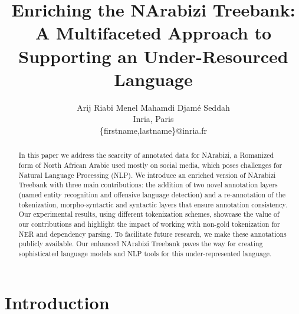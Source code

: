 \documentclass[11pt]{article}
\title{Enriching the NArabizi Treebank: A Multifaceted Approach to Supporting an Under-Resourced Language}
\author{Arij Riabi \quad Menel Mahamdi \quad Djamé Seddah \\
     Inria, Paris\\
     \{firstname,lastname\}@inria.fr}
\begin{document}






\maketitle
\begin{abstract}

  In this paper we address the scarcity of annotated data for
  NArabizi, a Romanized form of North African Arabic used mostly on
  social media, which poses challenges for Natural Language Processing
  (NLP). We introduce an enriched version of NArabizi Treebank
  \cite{seddah-etal-2020-building} with three main contributions: the
  addition of two novel annotation layers (named entity recognition
  and offensive language detection) and a re-annotation of the
  tokenization, morpho-syntactic and syntactic layers that ensure
  annotation consistency. Our experimental results, using different
  tokenization schemes, showcase the value of our contributions and
  highlight the impact of working with non-gold tokenization for NER
  and dependency parsing.  To facilitate future research, we make
  these annotations publicly available. Our enhanced NArabizi Treebank
  paves the way for creating sophisticated language models and NLP
  tools for this under-represented language.


\end{abstract}

\section{Introduction}
\end{document}

